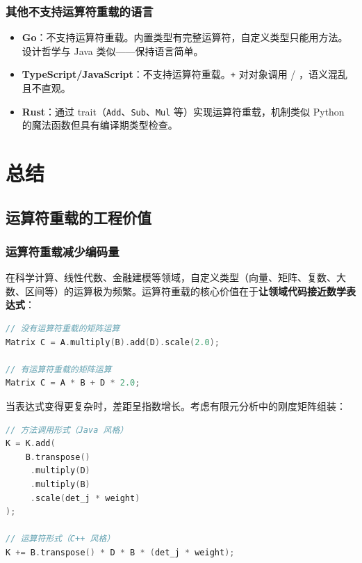 \documentclass[12pt,a4paper,fontset=fandol]{ctexbook}
\begin{document}
\section{其他不支持运算符重载的语言}

\begin{itemize}
  \item \textbf{Go}：不支持运算符重载。内置类型有完整运算符，自定义类型只能用方法。设计哲学与 Java 类似——保持语言简单。
  \item \textbf{TypeScript/JavaScript}：不支持运算符重载。\texttt{+} 对对象调用  / ，语义混乱且不直观。
  \item \textbf{Rust}：通过 trait（\texttt{Add}、\texttt{Sub}、\texttt{Mul} 等）实现运算符重载，机制类似 Python 的魔法函数但具有编译期类型检查。
\end{itemize}

\part{总结}

\chapter{运算符重载的工程价值}

\section{运算符重载减少编码量}

在科学计算、线性代数、金融建模等领域，自定义类型（向量、矩阵、复数、大数、区间等）的运算极为频繁。运算符重载的核心价值在于\textbf{让领域代码接近数学表达式}：

\begin{lstlisting}[language=C++]
// 没有运算符重载的矩阵运算
Matrix C = A.multiply(B).add(D).scale(2.0);

// 有运算符重载的矩阵运算
Matrix C = A * B + D * 2.0;
\end{lstlisting}

当表达式变得更复杂时，差距呈指数增长。考虑有限元分析中的刚度矩阵组装：

\begin{lstlisting}[language=C++]
// 方法调用形式（Java 风格）
K = K.add(
    B.transpose()
     .multiply(D)
     .multiply(B)
     .scale(det_j * weight)
);

// 运算符形式（C++ 风格）
K += B.transpose() * D * B * (det_j * weight);
\end{lstlisting}
\end{document}
